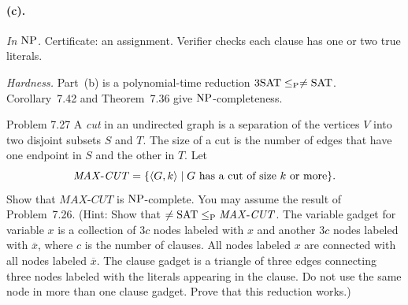 \begin{soln}
\paragraph{(c).}
\emph{In $\mathrm{NP}$.} Certificate: an assignment. Verifier checks each clause has one or two true literals.

\emph{Hardness.} Part~(b) is a polynomial-time reduction $3\mathrm{SAT}\le_{\mathrm{P}}\neq\mathrm{SAT}$. Corollary~7.42 and Theorem~7.36 give $\mathrm{NP}$-completeness.
\end{soln}

\begin{question}{Problem 7.27}
A \emph{cut} in an undirected graph is a separation of the vertices $V$ into two disjoint subsets $S$ and $T$. The size of a cut is the number of edges that have one endpoint in $S$ and the other in $T$. Let
\[
\mathit{MAX\text{-}CUT}=\{\langle G,k\rangle\mid G\text{ has a cut of size $k$ or more}\}.
\]
Show that $\mathit{MAX\text{-}CUT}$ is $\mathrm{NP}$-complete. You may assume the result of Problem~7.26. (Hint: Show that $\neq\mathrm{SAT}\le_{\mathrm{P}}\mathit{MAX\text{-}CUT}$. The variable gadget for variable $x$ is a collection of $3c$ nodes labeled with $x$ and another $3c$ nodes labeled with $\overline{x}$, where $c$ is the number of clauses. All nodes labeled $x$ are connected with all nodes labeled $\overline{x}$. The clause gadget is a triangle of three edges connecting three nodes labeled with the literals appearing in the clause. Do not use the same node in more than one clause gadget. Prove that this reduction works.)
\end{question}
